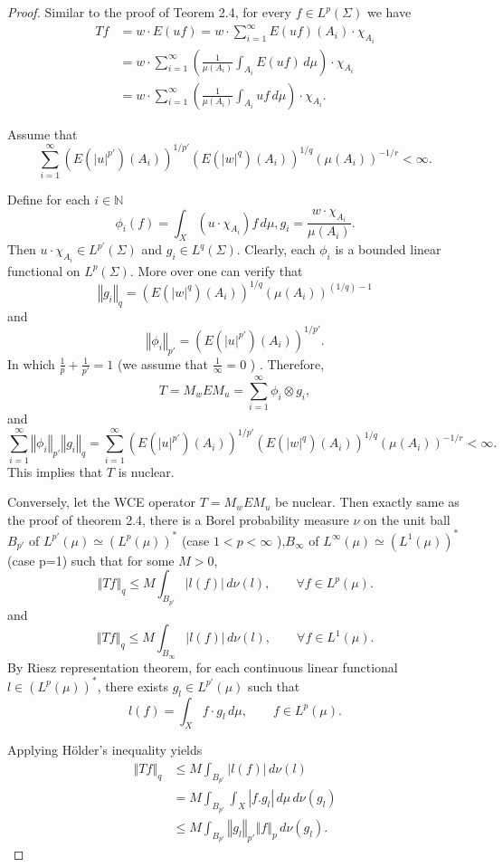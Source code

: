 \documentclass[10pt,a4paper]{amsart}
\newcommand{\norm}[1]{\left\Vert#1\right\Vert}
\begin{document}
\begin{proof}
	Similar to the proof of Teorem 2.4, for every $f \in L^p(\Sigma)$ we have
	\begin{align*}
		T f &= w \cdot E(uf) = w \cdot \sum_{i=1}^{\infty} E(uf)(A_i) \cdot \chi_{A_i} \\
		&= w \cdot \sum_{i=1}^{\infty} \left( \frac{1}{\mu(A_i)} \int_{A_i} E(uf) \, d\mu \right) \cdot \chi_{A_i} \\
		&= w \cdot \sum_{i=1}^{\infty} \left( \frac{1}{\mu(A_i)} \int_{A_i} u f \, d\mu \right) \cdot \chi_{A_i}.
	\end{align*}
	
	Assume that
	\[
	 \sum_{i=1}^{\infty} (E(|u|^{p'})(A_i))^{1/{p'}} (E(|w|^q)(A_i))^{1/q} (\mu(A_i))^{-1/r} < \infty.
	\]
	
	Define for each $i \in \mathbb N$ 
\[
\phi_i(f) = \int_X (u \cdot \chi_{A_i}) f \, d\mu , g_i = \frac{w \cdot \chi_{A_i}}{\mu(A_i)}.
\]
 Then $u \cdot \chi_{A_i} \in L^{p'}(\Sigma)$ and $g_i \in L^q(\Sigma)$. Clearly, each $\phi_i$ is a bounded linear functional on $L^p(\Sigma)$. More over one can verify that \[
 \norm{g_i}_q = (E(|w|^q)(A_i))^{1/q}(\mu(A_i))^{({1/q})-1}
 \] and
 \[
 \norm{\phi_i}_{p'} = (E(|u|^{p'})(A_i))^{1/{p'}}.
 \] In which $\frac{1}{p} + \frac{1}{p'} = {1} $ (we assume that $\frac{1}{\infty} = {0} $ ) . Therefore,
	\[
	T = M_w E M_u = \sum_{i=1}^{\infty} \phi_i \otimes g_i,
	\]
	and
	\[
	\sum_{i=1}^{\infty} \norm{\phi_i}_{p'} \norm{g_i}_{q} = \sum_{i=1}^{\infty} (E(|u|^{p'})(A_i))^{1/{p'}} (E(|w|^q)(A_i))^{1/q} (\mu(A_i))^{-1/r} < \infty.
	\]
	This implies that $T$ is nuclear.
	
	Conversely, let the WCE operator $T = M_w E M_u$ be nuclear. Then exactly same as the proof of theorem 2.4, there is a Borel probability measure $\nu$ on the unit ball $B_{p'}$ of $L^{p'}(\mu) \simeq (L^p(\mu))^*$ (case \(1< p< \infty\) ),$B_{\infty}$ of $L^{\infty}(\mu) \simeq (L^{1}(\mu))^*$ (case p=1)  such that for some $M > 0$,
	\[
	\norm{T f}_q \leq M \int_{B_{p'}} |l(f)| \, d\nu(l), \qquad \forall f \in L^p(\mu).
	\]
	and
	\[
	\norm{T f}_q \leq M \int_{B_{\infty}} |l(f)| \, d\nu(l), \qquad \forall f \in L^{1}(\mu).
	\]
	By Riesz representation theorem,  for each continuous linear functional $l \in (L^p(\mu))^*$, there exists $g_l \in L^{p'}(\mu)$ such that
	\[
	l(f) = \int_X f \cdot g_l \, d\mu, \qquad f \in L^p(\mu).
	\]
	
		Applying Hölder's inequality yields
	\begin{align*}
		\norm{T f}_q &\leq M \int_{B_{p'}} |l(f)| \, d\nu(l) \\
		&= M \int_{B_{p'}} \int_X |f . g_l| \, d\mu \, d\nu(g_l) \\
		&\leq M \int_{B_{p'}} \norm{g_l}_{p'} \norm{f}_p \, d\nu(g_l).
	\end{align*}
	

\end{proof}
\end{document}
